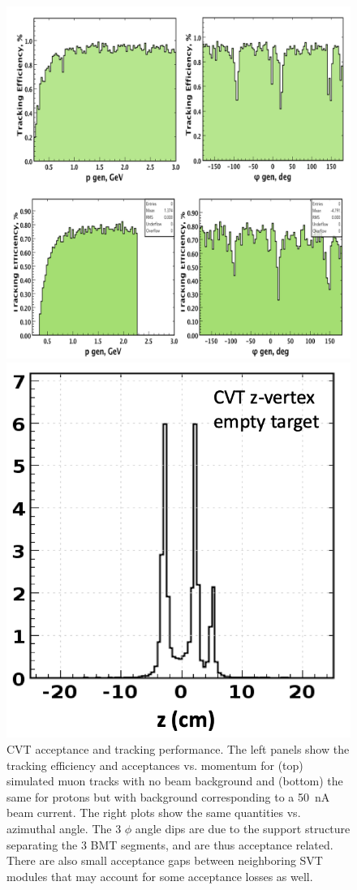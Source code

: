 \documentclass[final,3p,twocolumn]{elsarticle}
\begin{document}
\begin{figure}[t!]
\centerline{\includegraphics[width=1.0\columnwidth]{cvt-acceptance.png}}
\caption{CVT acceptance and tracking performance. The left panels show the tracking efficiency and acceptances vs.
  momentum for (top) simulated muon tracks with no beam background and (bottom) the same for protons but with
  background corresponding to a 50~nA beam current. The right plots show the same quantities vs. azimuthal angle. The
  3 $\phi$ angle dips are due to the support structure separating the 3 BMT segments, and are thus acceptance related.
  There are also small acceptance gaps between neighboring SVT modules that may account for some acceptance losses
  as well.}
\label{cvt-acceptance}
\vspace{0.3cm}
\centerline{\includegraphics[width=0.8\columnwidth]{cvt-vertex.png}}

\end{figure}
\end{document}
